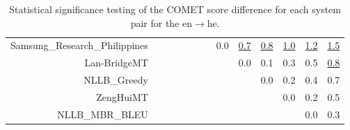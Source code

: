 \documentclass[11pt]{article}
\begin{document}
\begin{sidewaystable}
\begin{center}
{\begin{tabular}{rcccccccccccc}
Samsung\_Research\_Philippines &  &  &  &  &  &  & \cellcolor{red!0} 0.0 & \cellcolor{red!70} \underline{0.7} & \cellcolor{red!70} \underline{0.8} & \cellcolor{red!70} \underline{1.0} & \cellcolor{red!70} \underline{1.2} & \cellcolor{red!70} \underline{1.5}\\ 
Lan-BridgeMT &  &  &  &  &  &  &  & \cellcolor{red!0} 0.0 & \cellcolor{red!0} 0.1 & \cellcolor{red!0} 0.3 & \cellcolor{red!60} 0.5 & \cellcolor{red!70} \underline{0.8}\\ 
NLLB\_Greedy &  &  &  &  &  &  &  &  & \cellcolor{red!0} 0.0 & \cellcolor{red!0} 0.2 & \cellcolor{red!60} 0.4 & \cellcolor{red!70} 0.7\\ 
ZengHuiMT &  &  &  &  &  &  &  &  &  & \cellcolor{red!0} 0.0 & \cellcolor{red!0} 0.2 & \cellcolor{red!40} 0.5\\ 
NLLB\_MBR\_BLEU &  &  &  &  &  &  &  &  &  &  & \cellcolor{red!0} 0.0 & \cellcolor{red!0} 0.3\\ 
\bottomrule 
\end{tabular} }
\caption{Statistical significance testing of the COMET score difference for each system pair for the en$\rightarrow$he.} 
 \end{center} \end{sidewaystable} 
\end{document}
